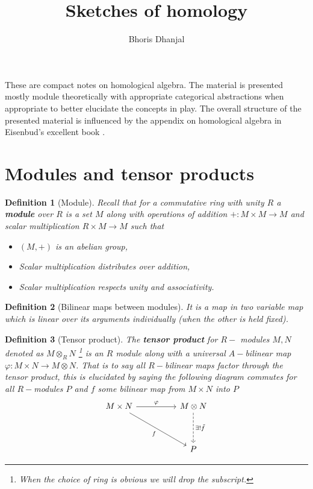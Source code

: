 \documentclass[12pt]{article}
\title{Sketches of homology}
\author{Bhoris Dhanjal}
\numberwithin{equation}{section}
\newtheorem{definition}{Definition}[section]
\begin{document}
	\tableofcontents
	\maketitle
	These are compact notes on homological algebra. The material is presented mostly module theoretically with appropriate categorical abstractions when appropriate to better elucidate the concepts in play. The overall structure of the presented material is influenced by the appendix on homological algebra in Eisenbud's excellent book \cite{eisenbud2013commutative}.

	\section{Modules and tensor products}
	\begin{definition}[Module]
			Recall that for a commutative ring with unity $R$ a \textbf{module} over $R$ is a set $M$ along with operations of addition $+:M\times M \to M$ and scalar multiplication $R\times M \to M$ such that 
		\begin{itemize}
			\item $(M,+)$ is an abelian group,
			\item Scalar multiplication distributes over addition,
			\item Scalar multiplication respects unity and associativity.
		\end{itemize}
	\end{definition}
	
	\begin{definition}[Bilinear maps between modules]
		It is a map in two variable map which is linear over its arguments individually (when the other is held fixed).
	\end{definition}
	
	\begin{definition}[Tensor product]
			The \textbf{tensor product} for $R-$ modules $M,N$ denoted as $M \otimes_R N$ \footnote{When the choice of ring is obvious we will drop the subscript.} is an $R$ module along with a universal $A-$bilinear map $\varphi:	M \times N \to M \otimes N$. That is to say all $R-$bilinear maps factor through the tensor product, this is elucidated by saying the following diagram commutes for all $ R-$modules $P$ and $f$ some bilinear map from $M \times N$ into $P$
		\[\begin{tikzcd}
			{M\times N} && {M\otimes N} \\
			\\
			&& P
			\arrow["\varphi", from=1-1, to=1-3]
			\arrow["f"', from=1-1, to=3-3]
			\arrow["{\exists! \tilde{f}}", dashed, from=1-3, to=3-3]
		\end{tikzcd}\]
	\end{definition}
	
\end{document}

